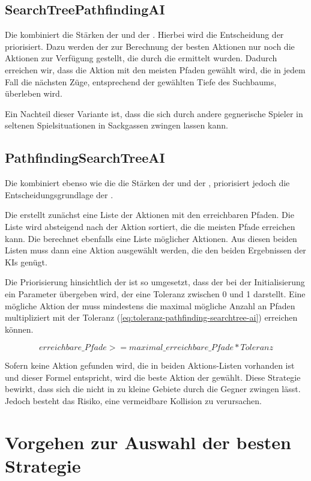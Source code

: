 \subsection{SearchTreePathfindingAI}
\label{subsec:searchtree-pathfinding-ai}

Die  kombiniert die Stärken der  und der .
Hierbei wird die Entscheidung der  priorisiert.
Dazu werden der  zur Berechnung der besten Aktionen nur noch die Aktionen zur Verfügung gestellt, die
durch die  ermittelt wurden.
Dadurch erreichen wir, dass die Aktion mit den meisten Pfaden gewählt wird, die in jedem Fall die nächsten Züge,
entsprechend der gewählten Tiefe des Suchbaums, überleben wird.

Ein Nachteil dieser Variante ist, dass die  sich durch andere gegnerische Spieler in
seltenen Spielsituationen in Sackgassen zwingen lassen kann.

\subsection{PathfindingSearchTreeAI}
\label{subsec:pathfinding-searchtree-ai}

Die  kombiniert ebenso wie die  die Stärken der
 und der , priorisiert jedoch die Entscheidungsgrundlage der
.

Die  erstellt zunächst eine Liste der Aktionen mit den erreichbaren Pfaden.
Die Liste wird absteigend nach der Aktion sortiert, die die meisten Pfade erreichen kann.
Die  berechnet ebenfalls eine Liste möglicher Aktionen.
Aus diesen beiden Listen muss dann eine Aktion ausgewählt werden, die den beiden Ergebnissen der \ac{KI}s genügt.

Die Priorisierung hinsichtlich der  ist so umgesetzt, dass der  bei
der Initialisierung ein Parameter übergeben wird, der eine Toleranz zwischen 0 und 1 darstellt.
Eine mögliche Aktion der  muss mindestens die maximal mögliche Anzahl an Pfaden multipliziert mit der
Toleranz (\ref{eq:toleranz-pathfinding-searchtree-ai}) erreichen können.

\begin{equation}
\label{eq:toleranz-pathfinding-searchtree-ai}
erreichbare\_Pfade >= maximal\_erreichbare\_Pfade * Toleranz
\end{equation}

Sofern keine Aktion gefunden wird, die in beiden Aktions-Listen vorhanden ist und dieser Formel entspricht, wird die
beste Aktion der  gewählt.
Diese Strategie bewirkt, dass sich die  nicht in zu kleine Gebiete durch die Gegner
zwingen lässt. Jedoch besteht das Risiko, eine vermeidbare Kollision zu verursachen.

\section{Vorgehen zur Auswahl der besten Strategie}
\label{sec:vorgehen-strategieauswahl}

